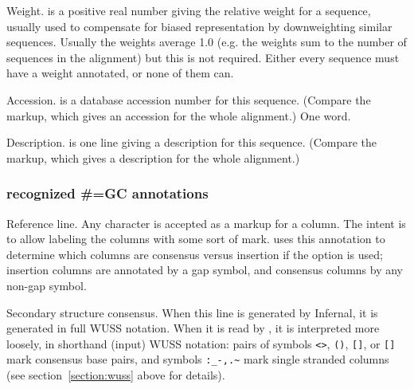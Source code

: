 \begin{sreitems}{}
\item [\emprog{WT  <f>}]
        Weight.  is a positive real number giving the
        relative weight for a sequence, usually used to compensate
        for biased representation by downweighting similar sequences.   
        Usually the weights average 1.0 (e.g. the weights sum to
        the number of sequences in the alignment) but this is not
        required. Either every sequence must have a weight annotated, 
        or none of them can.  

\item [\emprog{AC  <s>}]
        Accession.  is a database accession number for 
        this sequence. (Compare the  markup, which gives
        an accession for the whole alignment.) One word. 
        
\item [\emprog{DE  <s>}]
        Description.  is one line giving a description for
        this sequence. (Compare the  markup, which gives
        a description for the whole alignment.)
\end{sreitems}


\subsubsection{recognized \#=GC annotations}

\begin{sreitems}{}
\item [\emprog{RF}]
        Reference line. Any character is accepted as a markup for a
        column. The intent is to allow labeling the columns with some
        sort of mark.  uses this annotation to determine
        which columns are consensus versus insertion if the
         option is used; insertion columns are annotated
        by a gap symbol, and consensus columns by any non-gap symbol.
        
\item [\emprog{SS\_cons}]
	Secondary structure consensus.  When this line is generated by
        Infernal, it is generated in full WUSS notation.
        When it is read by , it is interpreted more
        loosely, in shorthand (input) WUSS notation: pairs of symbols
        \verb+<>+, \verb+()+, \verb+[]+, or \verb+[]+ mark consensus
        base pairs, and symbols \verb+:_-,.~+ mark single stranded
        columns (see section~\ref{section:wuss} above for details).

\end{sreitems}

